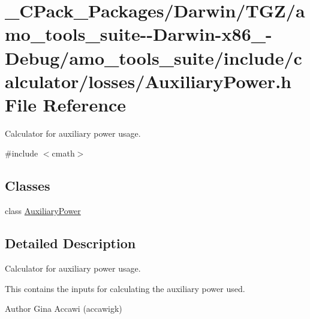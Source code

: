 \hypertarget{___c_pack___packages_2_darwin_2_t_g_z_2amo__tools__suite--_darwin-x86__64-_debug_2amo__tools__su1500b8b492f186f922fc2fb5fa337edd}{}\section{\+\_\+\+C\+Pack\+\_\+\+Packages/\+Darwin/\+T\+G\+Z/amo\+\_\+tools\+\_\+suite-\/-\/\+Darwin-\/x86\+\_-\/\+Debug/amo\+\_\+tools\+\_\+suite/include/calculator/losses/\+Auxiliary\+Power.h File Reference}
\label{___c_pack___packages_2_darwin_2_t_g_z_2amo__tools__suite--_darwin-x86__64-_debug_2amo__tools__su1500b8b492f186f922fc2fb5fa337edd}


Calculator for auxiliary power usage.  


{\ttfamily \#include $<$cmath$>$}\newline
\subsection*{Classes}
\begin{DoxyCompactItemize}
\item 
class \hyperlink{class_auxiliary_power}{Auxiliary\+Power}
\end{DoxyCompactItemize}


\subsection{Detailed Description}
Calculator for auxiliary power usage. 

This contains the inputs for calculating the auxiliary power used.

\begin{DoxyAuthor}{Author}
Gina Accawi (accawigk) 
\end{DoxyAuthor}
